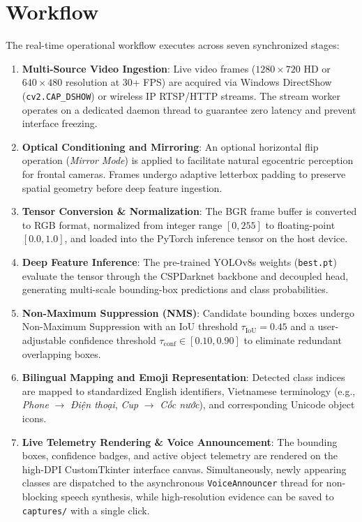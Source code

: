 \section{Workflow}
\label{sec:workflow}

The real-time operational workflow executes across seven synchronized stages:
\begin{enumerate}
    \item \textbf{Multi-Source Video Ingestion}: Live video frames ($1280 \times 720$ HD or $640 \times 480$ resolution at 30+ FPS) are acquired via Windows DirectShow (\texttt{cv2.CAP\_DSHOW}) or wireless IP RTSP/HTTP streams. The stream worker operates on a dedicated daemon thread to guarantee zero latency and prevent interface freezing.
    \item \textbf{Optical Conditioning and Mirroring}: An optional horizontal flip operation (\textit{Mirror Mode}) is applied to facilitate natural egocentric perception for frontal cameras. Frames undergo adaptive letterbox padding to preserve spatial geometry before deep feature ingestion.
    \item \textbf{Tensor Conversion \& Normalization}: The BGR frame buffer is converted to RGB format, normalized from integer range $[0, 255]$ to floating-point $[0.0, 1.0]$, and loaded into the PyTorch inference tensor on the host device.
    \item \textbf{Deep Feature Inference}: The pre-trained YOLOv8s weights (\texttt{best.pt}) evaluate the tensor through the CSPDarknet backbone and decoupled head, generating multi-scale bounding-box predictions and class probabilities.
    \item \textbf{Non-Maximum Suppression (NMS)}: Candidate bounding boxes undergo Non-Maximum Suppression with an IoU threshold $\tau_{\text{IoU}} = 0.45$ and a user-adjustable confidence threshold $\tau_{\text{conf}} \in [0.10, 0.90]$ to eliminate redundant overlapping boxes.
    \item \textbf{Bilingual Mapping and Emoji Representation}: Detected class indices are mapped to standardized English identifiers, Vietnamese terminology (e.g., \textit{Phone} $\rightarrow$ \textit{Điện thoại}, \textit{Cup} $\rightarrow$ \textit{Cốc nước}), and corresponding Unicode object icons.
    \item \textbf{Live Telemetry Rendering \& Voice Announcement}: The bounding boxes, confidence badges, and active object telemetry are rendered on the high-DPI CustomTkinter interface canvas. Simultaneously, newly appearing classes are dispatched to the asynchronous \texttt{VoiceAnnouncer} thread for non-blocking speech synthesis, while high-resolution evidence can be saved to \texttt{captures/} with a single click.
\end{enumerate}

